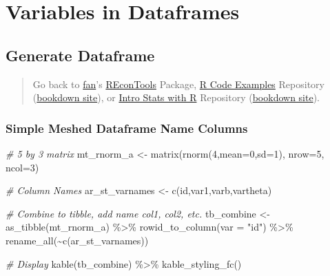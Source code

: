 \documentclass[
]{book}
\newenvironment{Shaded}{\begin{snugshade}}{\end{snugshade}}
\newcommand{\AttributeTok}[1]{\textcolor[rgb]{0.77,0.63,0.00}{#1}}
\newcommand{\CommentTok}[1]{\textcolor[rgb]{0.56,0.35,0.01}{\textit{#1}}}
\newcommand{\DecValTok}[1]{\textcolor[rgb]{0.00,0.00,0.81}{#1}}
\newcommand{\FunctionTok}[1]{\textcolor[rgb]{0.00,0.00,0.00}{#1}}
\newcommand{\NormalTok}[1]{#1}
\newcommand{\OtherTok}[1]{\textcolor[rgb]{0.56,0.35,0.01}{#1}}
\newcommand{\SpecialCharTok}[1]{\textcolor[rgb]{0.00,0.00,0.00}{#1}}
\newcommand{\StringTok}[1]{\textcolor[rgb]{0.31,0.60,0.02}{#1}}
\begin{document}
\hypertarget{variables-in-dataframes}{%
\section{Variables in Dataframes}\label{variables-in-dataframes}}

\hypertarget{generate-dataframe}{%
\subsection{Generate Dataframe}\label{generate-dataframe}}

\begin{quote}
Go back to \href{http://fanwangecon.github.io/}{fan}'s \href{https://fanwangecon.github.io/REconTools/}{REconTools} Package, \href{https://fanwangecon.github.io/R4Econ/}{R Code Examples} Repository (\href{https://fanwangecon.github.io/R4Econ/bookdown}{bookdown site}), or \href{https://fanwangecon.github.io/Stat4Econ/}{Intro Stats with R} Repository (\href{https://fanwangecon.github.io/Stat4Econ/bookdown}{bookdown site}).
\end{quote}

\hypertarget{simple-meshed-dataframe-name-columns}{%
\subsubsection{Simple Meshed Dataframe Name Columns}\label{simple-meshed-dataframe-name-columns}}

\begin{Shaded}
\begin{Highlighting}[]
\CommentTok{\# 5 by 3 matrix}
\NormalTok{mt\_rnorm\_a }\OtherTok{\textless{}{-}} \FunctionTok{matrix}\NormalTok{(}\FunctionTok{rnorm}\NormalTok{(}\DecValTok{4}\NormalTok{,}\AttributeTok{mean=}\DecValTok{0}\NormalTok{,}\AttributeTok{sd=}\DecValTok{1}\NormalTok{), }\AttributeTok{nrow=}\DecValTok{5}\NormalTok{, }\AttributeTok{ncol=}\DecValTok{3}\NormalTok{)}

\CommentTok{\# Column Names}
\NormalTok{ar\_st\_varnames }\OtherTok{\textless{}{-}} \FunctionTok{c}\NormalTok{(}\StringTok{\textquotesingle{}id\textquotesingle{}}\NormalTok{,}\StringTok{\textquotesingle{}var1\textquotesingle{}}\NormalTok{,}\StringTok{\textquotesingle{}varb\textquotesingle{}}\NormalTok{,}\StringTok{\textquotesingle{}vartheta\textquotesingle{}}\NormalTok{)}

\CommentTok{\# Combine to tibble, add name col1, col2, etc.}
\NormalTok{tb\_combine }\OtherTok{\textless{}{-}} \FunctionTok{as\_tibble}\NormalTok{(mt\_rnorm\_a) }\SpecialCharTok{\%\textgreater{}\%}
  \FunctionTok{rowid\_to\_column}\NormalTok{(}\AttributeTok{var =} \StringTok{"id"}\NormalTok{) }\SpecialCharTok{\%\textgreater{}\%}
  \FunctionTok{rename\_all}\NormalTok{(}\SpecialCharTok{\textasciitilde{}}\FunctionTok{c}\NormalTok{(ar\_st\_varnames))}

\CommentTok{\# Display}
\FunctionTok{kable}\NormalTok{(tb\_combine) }\SpecialCharTok{\%\textgreater{}\%} \FunctionTok{kable\_styling\_fc}\NormalTok{()}
\end{Highlighting}
\end{Shaded}
\end{document}
